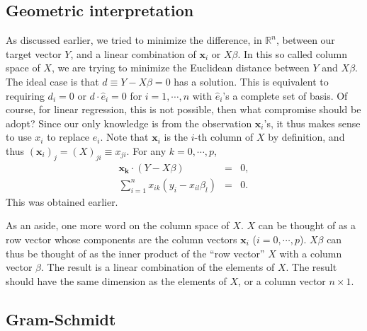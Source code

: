 \subsection{Geometric interpretation}
As discussed earlier, we tried to minimize the difference, in $\mathbb{R}^n$, between our target vector $Y$, and a linear combination of $\mathbf{x}_i$ or $X\beta$. In this so called column space of $X$, we are trying to minimize the Euclidean distance between $Y$ and $X\beta$. The ideal case is that $d\equiv Y-X\beta=0$ has a solution. This is equivalent to requiring $d_i=0$ or $d\cdot \hat e_i=0$ for $i=1,\cdots, n$ with $\hat e_i$'s a complete set of basis. Of course, for linear regression, this is not possible, then what compromise should be adopt? Since our only knowledge is from the observation $\mathbf{x}_i$'s, it thus makes sense to use $x_{i}$ to replace $\hat e_i$. Note that $\mathbf{x}_i$ is the $i$-th column of $X$ by definition, and thus $(\mathbf{x}_i)_j=(X)_{ji}\equiv x_{ji}$. For any $k=0,\cdots,p$,
\begin{eqnarray}
\mathbf{x_k}\cdot(Y-X\beta) &=& 0, \\
\sum_{i=1}^{n}x_{ik}(y_i-x_{il}\beta_l) &=& 0.
\end{eqnarray}
This was obtained earlier.

As an aside, one more word on the column space of $X$. $X$ can be thought of as a row vector whose components are the column vectors $\mathbf{x}_i$ ($i=0,\cdots,p$). $X\beta$ can thus be thought of as the inner product of the ``row vector'' $X$ with a column vector $\beta$. The result is a linear combination of the elements of $X$. The result should have the same dimension as the elements of $X$, or a column vector $n\times1$.
\subsection{Gram-Schmidt}


